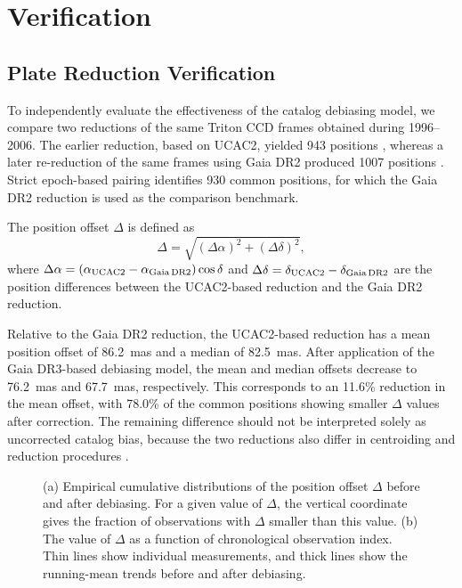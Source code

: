 \documentclass[linenumbers,amsmath,manuscript]{aastex702}
\begin{document}
\section{Verification} \label{sec:verification}

\subsection{Plate Reduction Verification}

To independently evaluate the effectiveness of the catalog debiasing model, we compare two reductions of the same Triton CCD frames obtained during 1996--2006. The earlier reduction, based on UCAC2, yielded 943 positions \citep{Qiao2007}, whereas a later re-reduction of the same frames using Gaia DR2 produced 1007 positions \citep{Yan2020}. Strict epoch-based pairing identifies 930 common positions, for which the Gaia DR2 reduction is used as the comparison benchmark.

The position offset $\Delta$ is defined as
\begin{equation}
\Delta = \sqrt{(\Delta\alpha)^2 + (\Delta\delta)^2},
\end{equation}
where $\Delta\alpha = (\alpha_{\rm UCAC2}-\alpha_{\rm Gaia\,DR2})\cos\delta$ and $\Delta\delta = \delta_{\rm UCAC2}-\delta_{\rm Gaia\,DR2}$ are the position differences between the UCAC2-based reduction and the Gaia DR2 reduction.

Relative to the Gaia DR2 reduction, the UCAC2-based reduction has a mean position offset of 86.2~mas and a median of 82.5~mas. After application of the Gaia DR3-based debiasing model, the mean and median offsets decrease to 76.2~mas and 67.7~mas, respectively. This corresponds to an 11.6\% reduction in the mean offset, with 78.0\% of the common positions showing smaller $\Delta$ values after correction. The remaining difference should not be interpreted solely as uncorrected catalog bias, because the two reductions also differ in centroiding and reduction procedures \citep{Yan2020}.

\begin{figure}[ht!]
\caption{(a) Empirical cumulative distributions of the position offset $\Delta$ before and after debiasing. For a given value of $\Delta$, the vertical coordinate gives the fraction of observations with $\Delta$ smaller than this value. (b) The value of $\Delta$ as a function of chronological observation index. Thin lines show individual measurements, and thick lines show the running-mean trends before and after debiasing.}
\label{fig:plate_validation}
\end{figure}
\end{document}
